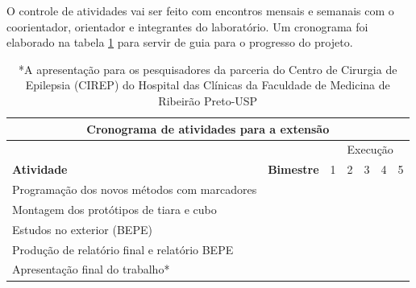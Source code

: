 O controle de atividades vai ser feito com encontros mensais e semanais com o coorientador, orientador e integrantes do laboratório. Um cronograma foi elaborado na tabela \ref{fig:tabela} para servir de guia para o progresso do projeto.

\begin{table}[h]
    \centering
    \begin{tabular}{lllllll} 
            \hline
        \multicolumn{7}{c}{\textbf{Cronograma de atividades para a extensão}} \\ 
            \hline
        & & {\cellcolor[rgb]{1,.3,.3}} & \multicolumn{4}{l}{Execução} \\ 
            \hline
        \textbf{Atividade} & \textbf{Bimestre} & 1 & 2 & 3 & 4 & 5\\ 
            \hline
        Programação dos novos métodos com marcadores & & {\cellcolor[rgb]{1,.3,.3}} & & & & \\ 
            \hline
        Montagem dos protótipos de tiara e cubo & & {\cellcolor[rgb]{1,.3,.3}} & {\cellcolor[rgb]{1,.3,.3}} & & & \\ 
            \hline
        Estudos no exterior (BEPE) & & & & {\cellcolor[rgb]{1,.3,.3}} & {\cellcolor[rgb]{1,.3,.3}} & \\ 
            \hline
        Produção de relatório final e relatório BEPE & & & & & & {\cellcolor[rgb]{1,.3,.3}}\\ 
            \hline
        Apresentação final do trabalho* & & & & & & {\cellcolor[rgb]{1,.3,.3}}  \\
            \hline
    \end{tabular}
    \caption{*A apresentação para os pesquisadores da parceria do Centro de Cirurgia de Epilepsia (CIREP) do Hospital das Clínicas da Faculdade de Medicina de Ribeirão Preto-USP}
    \label{fig:tabela}
\end{table}